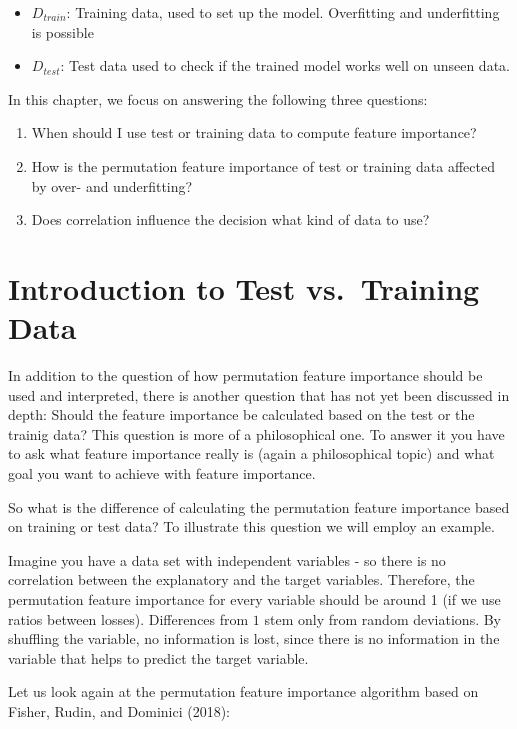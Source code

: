 \documentclass[]{krantz}
\begin{document}
\begin{itemize}
\item
  \(D_{train}\): Training data, used to set up the model. Overfitting
  and underfitting is possible
\item
  \(D_{test}\): Test data used to check if the trained model works well
  on unseen data.
\end{itemize}

In this chapter, we focus on answering the following three questions:

\begin{enumerate}
\def\labelenumi{\arabic{enumi}.}
\item
  When should I use test or training data to compute feature importance?
\item
  How is the permutation feature importance of test or training data
  affected by over- and underfitting?
\item
  Does correlation influence the decision what kind of data to use?
\end{enumerate}

\section{Introduction to Test vs.~Training
Data}\label{introduction-to-test-vs.training-data}

In addition to the question of how permutation feature importance should
be used and interpreted, there is another question that has not yet been
discussed in depth: Should the feature importance be calculated based on
the test or the trainig data? This question is more of a philosophical
one. To answer it you have to ask what feature importance really is
(again a philosophical topic) and what goal you want to achieve with
feature importance.

So what is the difference of calculating the permutation feature
importance based on training or test data? To illustrate this question
we will employ an example.

Imagine you have a data set with independent variables - so there is no
correlation between the explanatory and the target variables. Therefore,
the permutation feature importance for every variable should be around 1
(if we use ratios between losses). Differences from \(1\) stem only from
random deviations. By shuffling the variable, no information is lost,
since there is no information in the variable that helps to predict the
target variable.

Let us look again at the permutation feature importance algorithm based
on Fisher, Rudin, and Dominici (2018):
\end{document}
